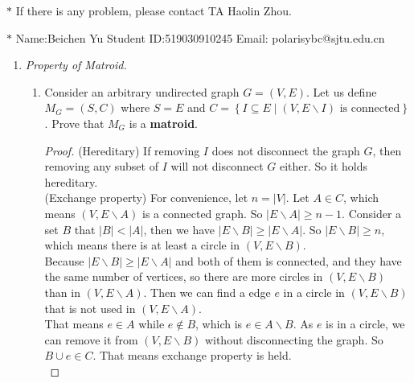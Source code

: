 \documentclass[12pt,a4paper]{article}
\theoremstyle{definition}
\begin{document}
\noindent

\noindent{}
\begin{center}
\footnotesize{\color{red}$*$ If there is any problem, please contact TA Haolin Zhou.}

\footnotesize{\color{blue}$*$ Name:Beichen Yu  \quad Student ID:519030910245 \quad Email: polarisybc@sjtu.edu.cn}
\end{center}

\begin{enumerate}
\item \textit{Property of Matroid.} 
\begin{enumerate}
	\item
	Consider an arbitrary undirected graph $ G=(V,E) $. Let us define $ M_{G}=(S,C) $ where $ S=E $ and $ C=\left\{I \subseteq E \mid\left(V, E \backslash I\right) \text { is connected}\right\} $. Prove that $ M_{G} $ is a \textbf{matroid}.\par
	    \begin{proof}
	    	(Hereditary) If removing $I$ does not disconnect the graph $G$, then removing any subset of $I$ will not disconnect $G$ either. So it holds hereditary.\\
	    	
	    	(Exchange property) For convenience, let $n=|V|$. Let $A \in C$, which means $(V,E \backslash A)$ is a connected graph. So $|E\backslash A| \geqslant n-1$. Consider a set $B$ that $|B|<|A|$, then we have $|E\backslash B| \geqslant |E\backslash A|$. So $|E\backslash B| \geqslant n$, which means there is at least a circle in $(V,E \backslash B)$. \\
	    	
	    	Because $|E\backslash B| \geqslant |E\backslash A|$ and both of them is connected, and they have the same number of vertices, so there are more circles in $(V,E \backslash B)$ than in $(V,E \backslash A)$. Then we can find a edge $e$ in a circle in $(V,E \backslash B)$ that is not used in $(V,E \backslash A)$. \\
	    	
	    	 That means $e \in A$ while $e \notin B$, which is $e \in A \backslash B$. As $e$ is in a circle, we can remove it from $(V,E \backslash B)$ without disconnecting the graph. So $B \cup {e} \in C$.  That means exchange property is held.\\
	    	

\end{proof}
\end{enumerate}
\end{enumerate}
\end{document}
